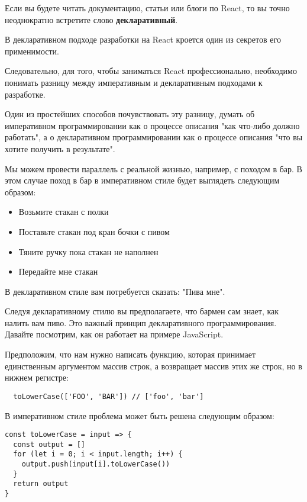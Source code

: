 Если вы будете читать документацию, статьи или блоги по React, то вы точно неоднократно встретите слово \textbf{декларативный}.

В декларативном подходе разработки на React кроется один из секретов его применимости.

Следовательно, для того, чтобы заниматься React профессионально, необходимо понимать разницу между императивным и декларативным подходами к разработке.

Один из простейших способов почувствовать эту разницу, думать об императивном программировании как о процессе описания "как что-либо должно работать", а о декларативном программировании как о процессе описания "что вы хотите получить в результате".

Мы можем провести параллель с реальной жизнью, например, с походом в бар. В этом случае поход в бар в императивном стиле будет выглядеть следующим образом:

\begin{itemize}
  \item Возьмите стакан с полки
  \item Поставьте стакан под кран бочки с пивом
  \item Тяните ручку пока стакан не наполнен
  \item Передайте мне стакан
\end{itemize}

В декларативном стиле вам потребуется сказать: "Пива мне".

Следуя декларативному стилю вы предполагаете, что бармен сам знает, как налить вам пиво. Это важный принцип декларативного программирования. Давайте посмотрим, как он работает на примере JavaScript.

Предположим, что нам нужно написать функцию, которая принимает единственным аргументом массив строк, а возвращает массив этих же строк, но в нижнем регистре:

\begin{lstlisting}
  toLowerCase(['FOO', 'BAR']) // ['foo', 'bar']
\end{lstlisting}

В императивном стиле проблема может быть решена следующим образом:

\begin{lstlisting}
const toLowerCase = input => {
  const output = []
  for (let i = 0; i < input.length; i++) {
    output.push(input[i].toLowerCase())
  }
  return output
}
\end{lstlisting}

